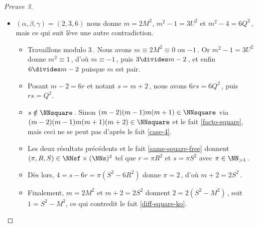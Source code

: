 \begin{proof}[Preuve 3]
\begin{itemize}
		\item $(\alpha, \beta, \gamma) = (2, 3, 6)$ nous donne $m = 2 M^2$, $m^2 - 1 = 3 U^2$ et $m^2 - 4 = 6 Q^2$\,, mais ce qui suit lève une autre contradiction.
		\begin{itemize}
			\item Travaillons modulo $3$\,.
			Nous avons $m \equiv 2 M^2 \equiv \text{$0$ ou $-1$}$\,. 
			Or $m^2 - 1 = 3 U^2$ donne $m^2 \equiv 1$\,, d'où $m \equiv -1$\,, puis $3 \divides m - 2$\,, et enfin $6 \divides m - 2$ puisque $m$ est pair.
			
			\item Posant $m - 2 = 6 r$ et notant $s = m + 2$\,, nous avons $6 r s = 6 Q^2$\,, puis $r s = Q^2$.
			
			\item $s \notin \NNsquare$\,. Sinon $(m-2)(m-1)m(m+1) \in \NNsquare$ via $(m-2)(m-1)m(m+1)(m+2)  \in \NNsquare$ et le fait \ref{facto-square}, mais ceci ne se peut pas d'après le fait \ref{case-4}.
			
			\item Les deux résultats précédents et le fait \ref{same-square-free} donnent $(\pi, R, S) \in \NNsf \times ( \NNs )^2$ tel que $r = \pi R^2$ et $s = \pi S^2$ avec  $\pi \in \NN_{>1}$\,.
			
			\item Dès lors, $4 = s - 6r = \pi (S^2 - 6 R^2)$ donne $\pi = 2$\,, d'où $m + 2 = 2 S^2$\,.
			
			\item Finalement, $m = 2 M^2$ et $m + 2 = 2 S^2$ donnent $2 = 2(S^2 - M^2)$\,, soit $1 = S^2 - M^2$, ce qui contredit le fait \ref{diff-square-ko}.
			\qedhere
		\end{itemize}
	\end{itemize}
\end{proof}

